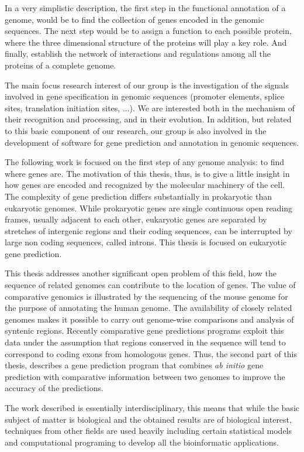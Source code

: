 In a very simplistic description, the first step in the functional
annotation of a genome, would be to find the collection of genes
encoded in the genomic sequences. The next step would be to assign a
function to each possible protein, where the three dimensional
structure of the proteins will play a key role. And finally, establish
the network of interactions and regulations among all the proteins of
a complete genome.

The main focus research interest of our group is  the investigation
of the signals involved in gene specification in genomic sequences
(promoter elements, splice sites, translation initiation sites,
...). We are interested both in the mechanism of their recognition and
processing, and in their evolution. In addition, but related to this
basic component of our research, our group is also involved in the
development of software for gene prediction and annotation in genomic
sequences. 

The following work is focused on the first step of any genome
analysis: to find where genes are. The motivation of this thesis,
thus, is to give a little insight in how genes are encoded and
recognized by the molecular machinery of the cell. The complexity of
gene prediction differs substantially in prokaryotic than eukaryotic
genomes. While prokaryotic genes are single continuous open reading
frames, usually adjacent to each other, eukaryotic genes are separated
by stretches of intergenic regions and their coding sequences, can be
interrupted by large non coding sequences, called introns. This
thesis is focused on eukaryotic gene prediction.

This thesis addresses another significant open problem of this field,
how the sequence of related genomes can contribute to the location of
genes. The value of comparative genomics is illustrated by the
sequencing of the mouse genome for the purpose of annotating the human
genome. The availability of closely related genomes makes it possible
to carry out genome-wise comparisons and analysis of syntenic regions.
Recently comparative gene predictions programs exploit this data under
the assumption that regions conserved in the sequence will tend to
correspond to coding exons from homologous genes. Thus, the second
part of this thesis, describes a gene prediction program that combines
\textit{ab initio} gene prediction with comparative information
between two genomes to improve the accuracy of the predictions.

The work described is essentially interdisciplinary, this means that
while the basic subject of matter is biological and the obtained
results are of biological interest, techniques from other fields are
used heavily including certain statistical models and computational
programing to develop all the bioinformatic applications.


